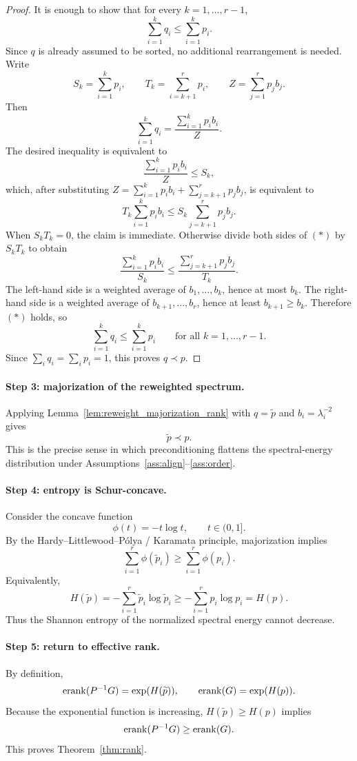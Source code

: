 \begin{proof}
It is enough to show that for every $k=1,\ldots,r-1$,
\[
\sum_{i=1}^k q_i \le \sum_{i=1}^k p_i.
\]
Since $q$ is already assumed to be sorted, no additional rearrangement is needed. Write
\[
S_k = \sum_{i=1}^k p_i,
\qquad
T_k = \sum_{i=k+1}^r p_i,
\qquad
Z = \sum_{j=1}^r p_j b_j.
\]
Then
\[
\sum_{i=1}^k q_i = \frac{\sum_{i=1}^k p_i b_i}{Z}.
\]
The desired inequality is equivalent to
\[
\frac{\sum_{i=1}^k p_i b_i}{Z} \le S_k,
\]
which, after substituting $Z = \sum_{i=1}^k p_i b_i + \sum_{j=k+1}^r p_j b_j$, is equivalent to
\[
T_k \sum_{i=1}^k p_i b_i \le S_k \sum_{j=k+1}^r p_j b_j.
\tag{$*$}
\]
When $S_k T_k = 0$, the claim is immediate. Otherwise divide both sides of $(*)$ by $S_k T_k$ to obtain
\[
\frac{\sum_{i=1}^k p_i b_i}{S_k}
\le
\frac{\sum_{j=k+1}^r p_j b_j}{T_k}.
\]
The left-hand side is a weighted average of $b_1,\ldots,b_k$, hence at most $b_k$. The right-hand side is a weighted average of $b_{k+1},\ldots,b_r$, hence at least $b_{k+1} \ge b_k$. Therefore $(*)$ holds, so
\[
\sum_{i=1}^k q_i \le \sum_{i=1}^k p_i
\qquad \text{for all } k=1,\ldots,r-1.
\]
Since $\sum_i q_i = \sum_i p_i = 1$, this proves $q \prec p$.
\end{proof}

\paragraph{Step 3: majorization of the reweighted spectrum.}
Applying Lemma~\ref{lem:reweight_majorization_rank} with $q = \widetilde p$ and $b_i = \lambda_i^{-2}$ gives
\[
\widetilde p \prec p.
\]
This is the precise sense in which preconditioning flattens the spectral-energy distribution under Assumptions~\ref{ass:align}--\ref{ass:order}.

\paragraph{Step 4: entropy is Schur-concave.}
Consider the concave function
\[
\phi(t) = -t \log t, \qquad t \in (0,1].
\]
By the Hardy--Littlewood--Pólya / Karamata principle, majorization implies
\[
\sum_{i=1}^r \phi(\widetilde p_i) \ge \sum_{i=1}^r \phi(p_i).
\]
Equivalently,
\[
H(\widetilde p) = -\sum_{i=1}^r \widetilde p_i \log \widetilde p_i
\ge
-\sum_{i=1}^r p_i \log p_i = H(p).
\]
Thus the Shannon entropy of the normalized spectral energy cannot decrease.

\paragraph{Step 5: return to effective rank.}
By definition,
\[
\mathrm{erank}(P^{-1}G) = \exp(H(\widetilde p)),
\qquad
\mathrm{erank}(G) = \exp(H(p)).
\]
Because the exponential function is increasing, $H(\widetilde p) \ge H(p)$ implies
\[
\mathrm{erank}(P^{-1}G) \ge \mathrm{erank}(G).
\]
This proves Theorem~\ref{thm:rank}.

